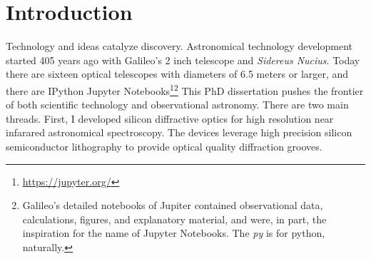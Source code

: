 \chapter{Introduction}


Technology and ideas catalyze discovery.  Astronomical technology development started 405 years ago with Galileo's 2 inch telescope and \emph{Sidereus Nucius}.  Today there are sixteen optical telescopes with diameters of 6.5 meters or larger, and there are IPython Jupyter Notebooks\footnote{\url{https://jupyter.org/}}\footnote{Galileo's detailed notebooks of Jupiter contained observational data, calculations, figures, and explanatory material, and were, in part, the inspiration for the name of Jupyter Notebooks.  The \emph{py} is for python, naturally.}  This PhD dissertation  pushes the frontier of both scientific technology and observational astronomy.  There are two main threads.  First, I developed silicon diffractive optics for high resolution near infarared astronomical spectroscopy.  The devices leverage high precision silicon semiconductor lithography to provide optical quality diffraction grooves.  